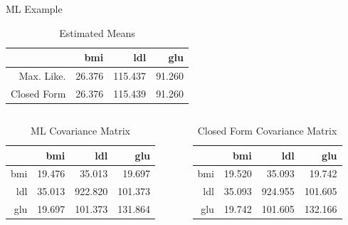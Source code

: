 \documentclass{beamer}\usepackage[]{graphicx}\usepackage[]{color}
\begin{document}
\begin{frame}{ML Example}
  
\begin{table}[ht]
\centering
\begin{tabular}{rrrr}
  \toprule
 & bmi & ldl & glu \\ 
  \midrule
Max. Like. & 26.376 & 115.437 & 91.260 \\ 
  Closed Form & 26.376 & 115.439 & 91.260 \\ 
   \bottomrule
\end{tabular}
\caption{Estimated Means} 
\end{table}



\begin{columns}
  \begin{column}{0.5\textwidth}
    
\begin{table}[ht]
\centering
\begin{tabular}{rrrr}
  \toprule
 & bmi & ldl & glu \\ 
  \midrule
bmi & 19.476 & 35.013 & 19.697 \\ 
  ldl & 35.013 & 922.820 & 101.373 \\ 
  glu & 19.697 & 101.373 & 131.864 \\ 
   \bottomrule
\end{tabular}
\caption{ML Covariance Matrix} 
\end{table}


\end{column}
\begin{column}{0.5\textwidth}
  
\begin{table}[ht]
\centering
\begin{tabular}{rrrr}
  \toprule
 & bmi & ldl & glu \\ 
  \midrule
bmi & 19.520 & 35.093 & 19.742 \\ 
  ldl & 35.093 & 924.955 & 101.605 \\ 
  glu & 19.742 & 101.605 & 132.166 \\ 
   \bottomrule
\end{tabular}
\caption{Closed Form Covariance Matrix} 
\end{table}


\end{column}
\end{columns}

\end{frame}
\end{document}
